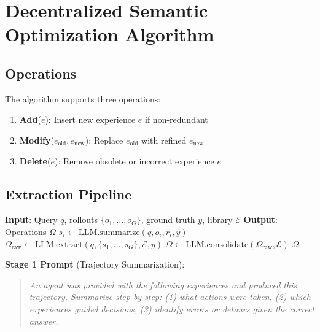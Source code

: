 \section{Decentralized Semantic Optimization Algorithm}

\label{sec:dso}

\subsection{Operations}

The \DSO{} algorithm supports three operations:

\begin{definition}
\begin{enumerate}
    \item \textbf{Add}($e$): Insert new experience $e$ if non-redundant
    \item \textbf{Modify}($e_{\text{old}}, e_{\text{new}}$): Replace $e_{\text{old}}$ with refined $e_{\text{new}}$
    \item \textbf{Delete}($e$): Remove obsolete or incorrect experience $e$
\end{enumerate}
\end{definition}

\subsection{Extraction Pipeline}

\begin{algorithm}[t]
\caption{Semantic Advantage Extraction}
\label{alg:extraction}
\begin{algorithmic}[1]
\STATE \textbf{Input}: Query $q$, rollouts $\{o_1, \ldots, o_G\}$, ground truth $y$, library $\mathcal{E}$
\STATE \textbf{Output}: Operations $\Omega$
\STATE {}
    \STATE $s_i \leftarrow \text{LLM.summarize}(q, o_i, r_i, y)$
\ENDFOR
\STATE {}
\STATE $\Omega_{\text{raw}} \leftarrow \text{LLM.extract}(q, \{s_1, \ldots, s_G\}, \mathcal{E}, y)$
\STATE {}
\STATE $\Omega \leftarrow \text{LLM.consolidate}(\Omega_{\text{raw}}, \mathcal{E})$
\RETURN $\Omega$
\end{algorithmic}
\end{algorithm}

\textbf{Stage 1 Prompt} (Trajectory Summarization):
\begin{quote}
\textit{An agent was provided with the following experiences and produced this trajectory. Summarize step-by-step: (1) what actions were taken, (2) which experiences guided decisions, (3) identify errors or detours given the correct answer.}
\end{quote}

